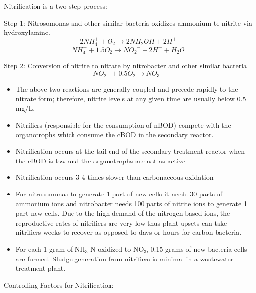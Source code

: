 			\noindent Nitrification is a two step process:
			
			Step 1:  Nitrosomonas and other similar bacteria oxidizes ammonium to nitrite via hydroxylamine.
			$$2NH_4^{+} + O_2 \rightarrow 2NH_2OH + 2H^{+}$$
			$$NH_4^{+} + 1.5 O_2 \rightarrow NO_2^{\enspace -} + 2H^{+}+ H_2O$$
					 
			Step 2:  Conversion of nitrite to nitrate by nitrobacter and other similar bacteria
			$$NO_2^{\enspace -} + 0.5O_2 \rightarrow NO_3^{\enspace -}$$

			\begin{itemize}
				\item The above two reactions are generally coupled and precede rapidly to the nitrate form; therefore, nitrite levels at any given time are usually below 0.5 mg/L.
				\item Nitrifiers (responsible for the consumption of nBOD) compete with the organotrophs which consume the cBOD in the secondary reactor.  \item Nitrification occurs at the tail end of the secondary treatment reactor when the cBOD is low and the organotrophs are not as active
				\item Nitrification occurs 3-4 times slower than carbonaceous oxidation
				\item For nitrosomonas to generate 1 part of new cells it needs 30 parts of ammonium ions and nitrobacter needs 100 parts of nitrite ions to generate 1 part new cells.  Due to the high demand of the nitrogen based ions, the reproductive rates of nitrifiers are very low thus plant upsets can take nitrifiers weeks to recover as opposed to days or hours for carbon bacteria.  
				\item For each 1-gram of NH$_3$-N oxidized to NO$_3$, 0.15 grams of new bacteria cells are formed.  Sludge generation from nitrifiers is minimal in a wastewater treatment plant.
			\end{itemize}
				Controlling Factors for Nitrification:
